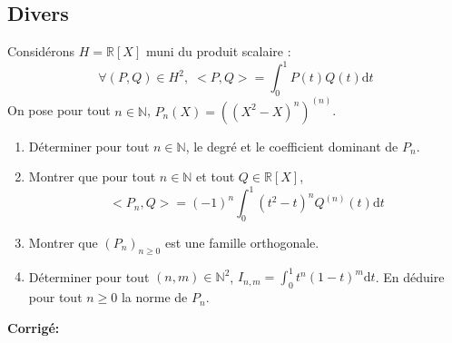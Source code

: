 \documentclass[a4paper,twoside,french,11pt]{VcCours}
\newcommand{\dt}{\text{d}t}
\newcommand{\corr}{\textbf{Corrigé:}}
\begin{document}
\subsection{Divers}



\begin{Exercice}{} Considérons $H= \mathbb{R}[X]$ muni du produit scalaire :
$$ \forall (P,Q) \in H^2, \; <P,Q> = \int_{0}^1 P(t) Q(t) \dt $$
On pose pour tout $n \in \mathbb{N}$, $P_n(X)= ((X^2-X)^n)^{(n)}$.

\begin{enumerate}
\item Déterminer pour tout $n \in \mathbb{N}$, le degré et le coefficient dominant de $P_n$.
\item Montrer que pour tout $n \in \mathbb{N}$ et tout $Q \in \mathbb{R}[X]$,
$$ <P_n,Q> = (-1)^n \int_{0}^1 (t^2-t)^n Q^{(n)}(t) \dt $$
\item Montrer que $(P_n)_{n \geq 0}$ est une famille orthogonale.
\item Déterminer pour tout $(n,m) \in \mathbb{N}^2$, $I_{n,m} = \int_{0}^1 t^n(1-t)^m \dt$. En déduire pour tout $n \geq 0$ la norme de $P_n$.
\end{enumerate}
\end{Exercice}

\corr 
\end{document}
